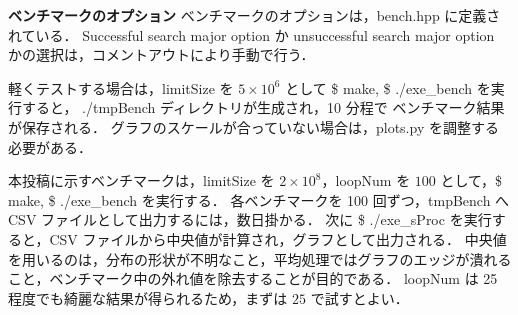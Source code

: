 {\bf ベンチマークのオプション}
\samepage\newline\indent
ベンチマークのオプションは，bench.hpp に定義されている．
Successful search major option か unsuccessful search major option かの選択は，コメントアウトにより手動で行う．

軽くテストする場合は，limitSize を $5\times 10^6$ として \$ make, \$ ./exe\_bench を実行すると，
./tmpBench ディレクトリが生成され，10 分程で ベンチマーク結果が保存される．
グラフのスケールが合っていない場合は，plots.py を調整する必要がある．

本投稿に示すベンチマークは，limitSize を $2\times10^8$，loopNum を $100$ として，\$ make, \$ ./exe\_bench を実行する．
各ベンチマークを 100 回ずつ，tmpBench へ CSV ファイルとして出力するには，数日掛かる．
次に \$ ./exe\_sProc を実行すると，CSV ファイルから中央値が計算され，グラフとして出力される．
中央値を用いるのは，分布の形状が不明なこと，平均処理ではグラフのエッジが潰れること，ベンチマーク中の外れ値を除去することが目的である．
loopNum は 25 程度でも綺麗な結果が得られるため，まずは $25$ で試すとよい．


